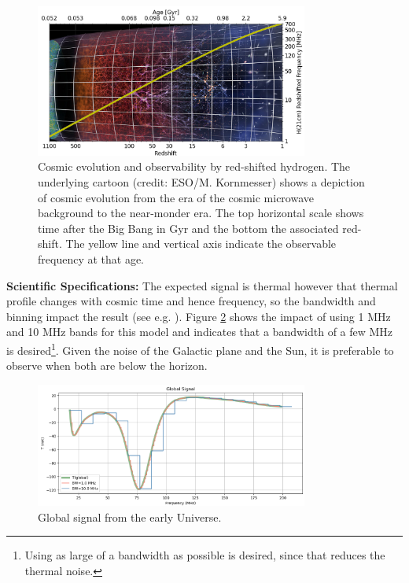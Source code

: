 \begin{figure}[h]
    \centering
    \includegraphics[width=0.8\textwidth]{figures/zage_lft3_python.png}
    \caption{Cosmic evolution and observability by red-shifted hydrogen.  The underlying cartoon (credit: ESO/M. Kornmesser) shows a depiction of cosmic evolution from the era of the cosmic microwave background to the near-monder era.  The top horizontal scale shows time after the Big Bang in Gyr and the bottom the associated red-shift.  The yellow line and vertical axis indicate the observable frequency at that age.}
    \label{fig:cosmo_h}
\end{figure}

\textbf{Scientific Specifications:} 
The expected signal is thermal however that thermal profile changes with cosmic time and hence frequency, so the bandwidth and binning impact the result (see e.g. \citealt{2017PASP..129d5001D}).  Figure \ref{fig:global_T_bw} shows the impact of using 1 MHz and 10 MHz bands for this model and indicates that a bandwidth of a few MHz is desired\footnote{Using as large of a bandwidth as possible is desired, since that reduces the thermal noise.}.
Given the noise of the Galactic plane and the Sun, it is preferable to observe when both are below the horizon.

\begin{figure}[h]
    \centering
    \includegraphics[width=0.8\textwidth]{figures/global_with_bw.png}
    \caption{Global signal from the early Universe.}
    \label{fig:global_T_bw}
\end{figure}

